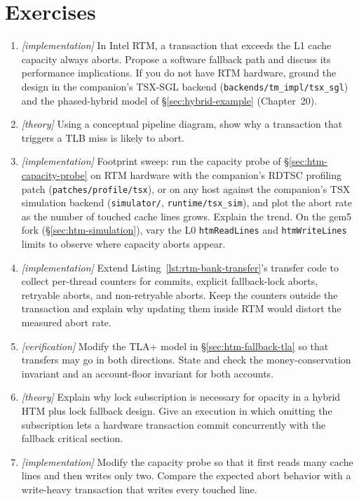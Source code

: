 \section{Exercises}
\begin{enumerate}
    \item \emph{[implementation]} In Intel RTM, a transaction that exceeds the L1 cache capacity always aborts. Propose a software fallback path and discuss its performance implications. If you do not have RTM hardware, ground the design in the companion's TSX-SGL backend (\texttt{backends/tm\_impl/tsx\_sgl}) and the phased-hybrid model of \S\ref{sec:hybrid-example} (Chapter~20).
    \item \emph{[theory]} Using a conceptual pipeline diagram, show why a transaction that triggers a TLB miss is likely to abort.
    \item \emph{[implementation]} Footprint sweep: run the capacity probe of \S\ref{sec:htm-capacity-probe} on RTM hardware with the companion's RDTSC profiling patch (\texttt{patches/profile/tsx}), or on any host against the companion's TSX simulation backend (\texttt{simulator/}, \texttt{runtime/tsx\_sim}), and plot the abort rate as the number of touched cache lines grows. Explain the trend. On the gem5 fork (\S\ref{sec:htm-simulation}), vary the L0 \texttt{htmReadLines} and \texttt{htmWriteLines} limits to observe where capacity aborts appear.
    \item \emph{[implementation]} Extend Listing~\ref{lst:rtm-bank-transfer}'s transfer code to collect per-thread counters for commits, explicit fallback-lock aborts, retryable aborts, and non-retryable aborts. Keep the counters outside the transaction and explain why updating them inside RTM would distort the measured abort rate.
    \item \emph{[verification]} Modify the TLA+ model in \S\ref{sec:htm-fallback-tla} so that transfers may go in both directions. State and check the money-conservation invariant and an account-floor invariant for both accounts.
    \item \emph{[theory]} Explain why lock subscription is necessary for opacity in a hybrid HTM plus lock fallback design. Give an execution in which omitting the subscription lets a hardware transaction commit concurrently with the fallback critical section.
    \item \emph{[implementation]} Modify the capacity probe so that it first reads many cache lines and then writes only two. Compare the expected abort behavior with a write-heavy transaction that writes every touched line.

\end{enumerate}

